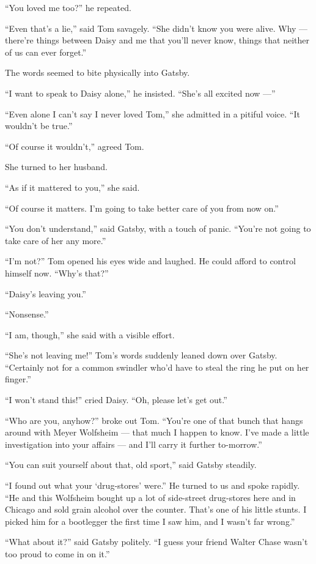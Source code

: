 \documentclass{znotebook}
\begin{document}
``You loved me too?'' he repeated.

``Even that's a lie,'' said Tom savagely. ``She didn't know you were alive. Why ---{} there're things between Daisy and me that you'll never know, things that neither of us can ever forget.''

The words seemed to bite physically into Gatsby.

``I want to speak to Daisy alone,'' he insisted. ``She's all excited now ---''

``Even alone I can't say I never loved Tom,'' she admitted in a pitiful voice. ``It wouldn't be true.''

``Of course it wouldn't,'' agreed Tom.

She turned to her husband.

``As if it mattered to you,'' she said.

``Of course it matters. I'm going to take better care of you from now on.''

``You don't understand,'' said Gatsby, with a touch of panic. ``You're not going to take care of her any more.''

``I'm not?'' Tom opened his eyes wide and laughed. He could afford to control himself now. ``Why's that?''

``Daisy's leaving you.''

``Nonsense.''

``I am, though,'' she said with a visible effort.

``She's not leaving me!'' Tom's words suddenly leaned down over Gatsby. ``Certainly not for a common swindler who'd have to steal the ring he put on her finger.''

``I won't stand this!'' cried Daisy. ``Oh, please let's get out.''

``Who are you, anyhow?'' broke out Tom. ``You're one of that bunch that hangs around with Meyer Wolfsheim ---{} that much I happen to know. I've made a little investigation into your affairs ---{} and I'll carry it further to-morrow.''

``You can suit yourself about that, old sport,'' said Gatsby steadily.

``I found out what your ‘drug-stores' were.'' He turned to us and spoke rapidly. ``He and this Wolfsheim bought up a lot of side-street drug-stores here and in Chicago and sold grain alcohol over the counter. That's one of his little stunts. I picked him for a bootlegger the first time I saw him, and I wasn't far wrong.''

``What about it?'' said Gatsby politely. ``I guess your friend Walter Chase wasn't too proud to come in on it.''
\end{document}
